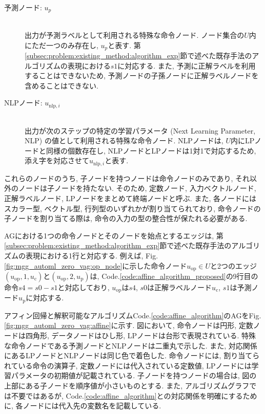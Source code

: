 \documentclass[11pt,oneside,openany,report]{jsbook}
\begin{document}
\begin{description}
  \begin{description}
    \item[予測ノード: $u_{p}$] \ \\ 出力が予測ラベルとして利用される特殊な命令ノード. ノード集合の$U$内にただ一つのみ存在し, $u_{p}$と表す. 第\ref{subsec:problem:existing_method:algorithm_exp}節で述べた既存手法のアルゴリズムの表現における$s1$に対応する. また, 予測に正解ラベルを利用することはできないため, 予測ノードの子孫ノードに正解ラベルノードを含めることはできない.
    \item[NLPノード: $u_{\mathrm{nlp},i}$] \ \\ 出力が次のステップの特定の学習パラメータ (Next Learning Parameter, NLP) の値として利用される特殊な命令ノード. NLPノードは, $U$内にLPノードと同様の個数存在し, NLPノードとLPノードは1対1で対応するため, 添え字を対応させて$u_{\mathrm{nlp},i}$と表す.
  \end{description}
\end{description}
\noindent
これらのノードのうち, 子ノードを持つノードは命令ノードのみであり, それ以外のノードは子ノードを持たない. そのため, 定数ノード, 入力ベクトルノード, 正解ラベルノード, LPノードをまとめて終端ノードと呼ぶ. また, 各ノードにはスカラー型, ベクトル型, 行列型のいずれかが割り当てられており, 命令ノードの子ノードを割り当てる際は, 命令の入力の型の整合性が保たれる必要がある.

AGにおける1つの命令ノードとそのノードを始点とするエッジは, 第\ref{subsec:problem:existing_method:algorithm_exp}節で述べた既存手法のアルゴリズムの表現における1行と対応する. 例えば, Fig.\ref{fig:mgg_automl_zero_vag:op_node}に示した命令ノード$u_\mathrm{op} \in U$と2つのエッジ$(u_\mathrm{op}, 1, u_\mathrm{c})$と$(u_\mathrm{op}, 2, u_\mathrm{p})$は, Code.\ref{code:affine_algorithm_proposed}の9行目の命令$s4 = s0 - s1$と対応しており, $u_\mathrm{op}$は$s4$, $s0$は正解ラベルノード$u_\mathrm{c}$, $s1$は予測ノード$u_\mathrm{p}$に対応する.

アフィン回帰と解釈可能なアルゴリズムCode.\ref{code:affine_algorithm}のAGをFig.\ref{fig:mgg_automl_zero_vag:affine}に示す. 図において, 命令ノードは円形, 定数ノードは四角形, データノードはひし形, LPノードは台形で表現されている. 特殊な命令ノードである予測ノードとNLPノードは二重丸で示した. また, 対応関係にあるLPノードとNLPノードは同じ色で着色した. 命令ノードには, 割り当てられている命令の演算子, 定数ノードには代入されている定数値, LPノードには学習パラメータの初期値が記載されている. 子ノードを持つノードの場合は, 図の上部にある子ノードを順序値が小さいものとする. また, アルゴリズムグラフでは不要ではあるが, Code.\ref{code:affine_algorithm}との対応関係を明確にするために, 各ノードには代入先の変数名を記載している.
\end{document}
